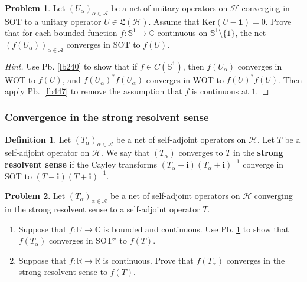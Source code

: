\documentclass[12pt,b5paper,notitlepage]{article}
\theoremstyle{definition}
\newtheorem{df}{Definition}[subsection]
\newtheorem{prob}{\color{red}Problem}[section]
\theoremstyle{plain}
\newcommand{\fk}{\mathfrak}
\newcommand{\idt}{\mathbf{1}}
\newcommand{\im}{\mathbf{i}}
\newcommand{\Cbb}{\mathbb C}
\newcommand{\Rbb}{\mathbb R}
\newcommand{\Ker}{\mathrm{Ker}}
\newcommand{\Sbb}{{\mathbb S}}
\newcommand{\MH}{\mathcal H}
\newcommand{\SA}{\mathscr A}
\numberwithin{equation}{section}
\begin{document}
\begin{prob}\label{lb448}
Let $(U_\alpha)_{\alpha\in\SA}$ be a net of unitary operators on $\MH$ converging in SOT to a unitary operator $U\in\fk L(\MH)$. Assume that $\Ker(U-\idt)=0$. Prove that for each bounded function $f:\Sbb^1\rightarrow\Cbb$ continuous on $\Sbb^1\setminus\{1\}$, the net $(f(U_\alpha))_{\alpha\in\SA}$ converges in SOT to $f(U)$.
\end{prob}

\begin{proof}[Hint]
Use Pb. \ref{lb240} to show that if $f\in C(\Sbb^1)$, then $f(U_\alpha)$ converges in WOT to $f(U)$, and $f(U_\alpha)^*f(U_\alpha)$ converges in WOT to $f(U)^*f(U)$. Then apply Pb.\ \ref{lb447} to remove the assumption that $f$ is continuous at $1$.
\end{proof}


\subsubsection{Convergence in the strong resolvent sense}


\begin{df}
Let $(T_\alpha)_{\alpha\in\SA}$ be a net of self-adjoint operators on $\MH$. Let $T$ be a self-adjoint operator on $\MH$. We say that $(T_\alpha)$ converges to $T$ in the \textbf{strong resolvent sense}  if the Cayley transforms $(T_\alpha-\im)(T_\alpha+\im)^{-1}$ converge in SOT to $(T-\im)(T+\im)^{-1}$.
\end{df}


\begin{prob}
Let $(T_\alpha)_{\alpha\in\SA}$ be a net of self-adjoint operators on $\MH$ converging in the strong resolvent sense to a self-adjoint operator $T$.
\begin{enumerate}
\item Suppose that $f:\Rbb\rightarrow\Cbb$ is bounded and continuous. Use Pb. \ref{lb448} to show that $f(T_\alpha)$ converges in SOT* to $f(T)$. 
\item  Suppose that $f:\Rbb\rightarrow\Rbb$ is continuous. Prove that $f(T_\alpha)$ converges in the strong resolvent sense to $f(T)$.
\end{enumerate}
\end{prob}
\end{document}
